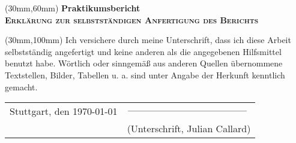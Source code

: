 
%
\newpage
\begin{textblock*}{\textwidth}(30mm,60mm)
\centering
{\bfseries Praktikumsbericht} \\[1ex]
\bfseries\scshape Erklärung zur selbstständigen Anfertigung des Berichts\par
\end{textblock*}
\vspace{5ex}

\begin{textblock*}{\textwidth}(30mm,100mm)
\centering	
Ich versichere durch meine Unterschrift, dass ich diese Arbeit selbstständig angefertigt
und keine anderen als die angegebenen Hilfsmittel benutzt habe. Wörtlich oder
sinngemäß aus anderen Quellen übernommene Textstellen, Bilder, Tabellen u. a. sind
unter Angabe der Herkunft kenntlich gemacht.\par
\end{textblock*}

\vspace{5ex}

\vspace*{10cm}\begin{tabular}{p{7cm}p{5cm}}
	Stuttgart, den \today & $\rule{5cm}{0.01cm}$ \\
	& (Unterschrift, Julian Callard)
\end{tabular}


\newpage

